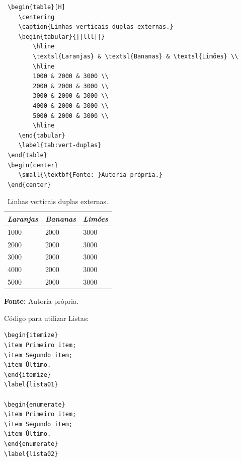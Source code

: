 \documentclass{modelo}
\begin{document}
 \begin{verbatim}   
 \begin{table}[H]  
 	\centering  
 	\caption{Linhas verticais duplas externas.} 
 	\begin{tabular}{||lll||}  
 		\hline  
 		\textsl{Laranjas} & \textsl{Bananas} & \textsl{Limões} \\  
 		\hline  
 		1000 & 2000 & 3000 \\  
 		2000 & 2000 & 3000 \\ 
 		3000 & 2000 & 3000 \\  
 		4000 & 2000 & 3000 \\  
 		5000 & 2000 & 3000 \\  
 		\hline  
 	\end{tabular}   
 	\label{tab:vert-duplas}   
 \end{table} 
 \begin{center}
 	\small{\textbf{Fonte: }Autoria própria.}
 \end{center}  
\end{verbatim} 
 
  \begin{table}[H]  
 	\centering  
 	\caption{Linhas verticais duplas externas.} 
 	\begin{tabular}{||lll||}  
 		\hline  
 		\textsl{Laranjas} & \textsl{Bananas} & \textsl{Limões} \\  
 		\hline  
 		1000 & 2000 & 3000 \\  
 		2000 & 2000 & 3000 \\ 
 		3000 & 2000 & 3000 \\  
 		4000 & 2000 & 3000 \\  
 		5000 & 2000 & 3000 \\  
 		\hline  
 	\end{tabular}   
 	\label{tab:vert-duplas}   
 \end{table} 
 \begin{center}
 	\small{\textbf{Fonte: }Autoria própria.}
 \end{center}
 
 Código para utilizar Listas: 
\begin{verbatim}
\begin{itemize}  
\item Primeiro item;  
\item Segundo item; 
\item Último.
\end{itemize} 
\label{lista01} 
 
\begin{enumerate}  
\item Primeiro item;  
\item Segundo item; 
\item Último.
\end{enumerate} 
\label{lista02} 
 
\end{verbatim} 
\end{document}
